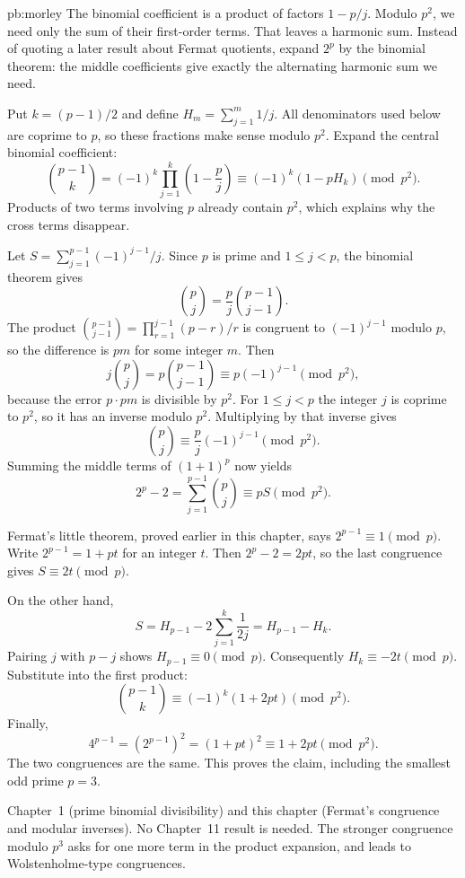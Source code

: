\begin{solution}{pb:morley}
\idea The binomial coefficient is a product of factors
$1-p/j$. Modulo $p^2$, we need only the sum of their
first-order terms. That leaves a harmonic sum. Instead of
quoting a later result about Fermat quotients, expand $2^p$
by the binomial theorem: the middle coefficients give exactly
the alternating harmonic sum we need.

\writeup Put $k=(p-1)/2$ and define
$H_m=\sum_{j=1}^m1/j$. All denominators used below are
coprime to $p$, so these fractions make sense modulo $p^2$.
Expand the central binomial coefficient:
\[
\binom{p-1}{k}
=(-1)^k\prod_{j=1}^k\left(1-\frac pj\right)
\equiv(-1)^k(1-pH_k)\pmod{p^2}.
\]
Products of two terms involving $p$ already contain $p^2$,
which explains why the cross terms disappear.

Let $S=\sum_{j=1}^{p-1}(-1)^{j-1}/j$.
Since $p$ is prime and $1\le j<p$, the binomial theorem gives
\[
\binom pj=\frac pj\binom{p-1}{j-1}.
\]
The product $\binom{p-1}{j-1}=\prod_{r=1}^{j-1}(p-r)/r$ is congruent to $(-1)^{j-1}$ modulo $p$, so the difference is $pm$ for some integer $m$. Then
\[
j\binom pj=p\binom{p-1}{j-1}\equiv p(-1)^{j-1}\pmod{p^2},
\]
because the error $p\cdot pm$ is divisible by $p^2$. For $1\le j<p$ the integer $j$ is coprime to $p^2$, so it has an inverse modulo $p^2$. Multiplying by that inverse gives
\[
\binom pj\equiv\frac pj(-1)^{j-1}\pmod{p^2}.
\]
Summing the middle terms of $(1+1)^p$ now yields
\[
2^p-2=\sum_{j=1}^{p-1}\binom pj
\equiv pS\pmod{p^2}.
\]

Fermat's little theorem, proved earlier in this chapter,
says $2^{p-1}\equiv1\pmod p$. Write
$2^{p-1}=1+pt$ for an integer $t$. Then
$2^p-2=2pt$, so the last congruence gives
$S\equiv2t\pmod p$.

On the other hand,
\[
S=H_{p-1}-2\sum_{j=1}^k\frac1{2j}
=H_{p-1}-H_k.
\]
Pairing $j$ with $p-j$ shows $H_{p-1}\equiv0\pmod p$.
Consequently $H_k\equiv-2t\pmod p$.
Substitute into the first product:
\[
\binom{p-1}{k}\equiv(-1)^k(1+2pt)\pmod{p^2}.
\]
Finally,
\[
4^{p-1}=(2^{p-1})^2=(1+pt)^2
\equiv1+2pt\pmod{p^2}.
\]
The two congruences are the same. This proves the claim,
including the smallest odd prime $p=3$.

\tools Chapter~1 (prime binomial divisibility) and this chapter
(Fermat's congruence and modular inverses). No Chapter~11 result
is needed.
\leads The stronger congruence modulo $p^3$ asks for
one more term in the product expansion, and leads to
Wolstenholme-type congruences.
\end{solution}

